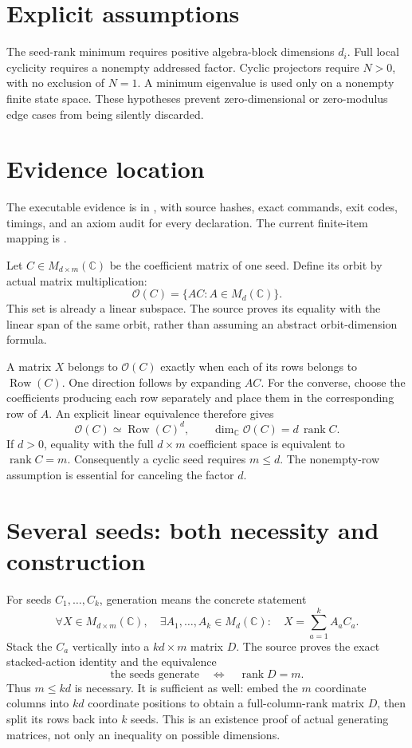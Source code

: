 \documentclass[10pt,letterpaper]{article}
\newcommand{\C}{\mathbb C}\newcommand{\R}{\mathbb R}\newcommand{\N}{\mathbb N}
\newcommand{\rank}{\operatorname{rank}}\newcommand{\spanof}{\operatorname{span}}
\newcommand{\pageheading}[2]{\vspace*{2pt}{\small\color{ink}\textsc{#1}}\par\vspace{2pt}{\Large\bfseries #2}\par\vspace{4pt}}
\begin{document}
\section*{Explicit assumptions}
The seed-rank minimum requires positive algebra-block dimensions $d_i$. Full local cyclicity requires a nonempty addressed factor. Cyclic projectors require $N>0$, with no exclusion of $N=1$. A minimum eigenvalue is used only on a nonempty finite state space. These hypotheses prevent zero-dimensional or zero-modulus edge cases from being silently discarded.

\section*{Evidence location}
The executable evidence is in , with source hashes, exact commands, exit codes, timings, and an axiom audit for every declaration. The current finite-item mapping is .

\newpage
\pageheading{Theorems 2.1 and 2.2}{Actual orbits and sharp seed counts}
Let $C\in M_{d\times m}(\C)$ be the coefficient matrix of one seed. Define its orbit by actual matrix multiplication:
\[
\mathcal O(C)=\{AC:A\in M_d(\C)\}.
\]
This set is already a linear subspace. The source proves its equality with the linear span of the same orbit, rather than assuming an abstract orbit-dimension formula.

A matrix $X$ belongs to $\mathcal O(C)$ exactly when each of its rows belongs to $\operatorname{Row}(C)$. One direction follows by expanding $AC$. For the converse, choose the coefficients producing each row separately and place them in the corresponding row of $A$. An explicit linear equivalence therefore gives
\[
\mathcal O(C)\simeq \operatorname{Row}(C)^d,
\qquad
\boxed{\dim_\C\mathcal O(C)=d\,\rank C.}
\]
If $d>0$, equality with the full $d\times m$ coefficient space is equivalent to $\rank C=m$. Consequently a cyclic seed requires $m\le d$. The nonempty-row assumption is essential for canceling the factor $d$.

\section*{Several seeds: both necessity and construction}
For seeds $C_1,\ldots,C_k$, generation means the concrete statement
\[
\forall X\in M_{d\times m}(\C),\quad
\exists A_1,\ldots,A_k\in M_d(\C):\quad
X=\sum_{a=1}^k A_aC_a.
\]
Stack the $C_a$ vertically into a $kd\times m$ matrix $D$. The source proves the exact stacked-action identity and the equivalence
\[
\text{the seeds generate}\quad\Longleftrightarrow\quad\rank D=m.
\]
Thus $m\le kd$ is necessary. It is sufficient as well: embed the $m$ coordinate columns into $kd$ coordinate positions to obtain a full-column-rank matrix $D$, then split its rows back into $k$ seeds. This is an existence proof of actual generating matrices, not only an inequality on possible dimensions.
\end{document}
